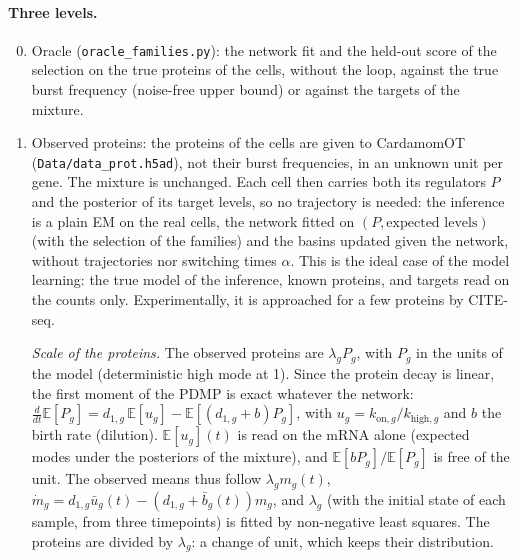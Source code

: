 \documentclass[a4paper, 11pt]{article}
\theoremstyle{plain}
\theoremstyle{remark}
\begin{document}
\paragraph{Three levels.}
\begin{enumerate}[nosep]
\setcounter{enumi}{-1}
\item Oracle (\texttt{oracle\_families.py}): the network fit and the held-out score of the selection on the true proteins of the cells, without the loop, against the true burst frequency (noise-free upper bound) or against the targets of the mixture.
\item Observed proteins: the proteins of the cells are given to CardamomOT (\texttt{Data/data\_prot.h5ad}), not their burst frequencies, in an unknown unit per gene. The mixture is unchanged. Each cell then carries both its regulators $P$ and the posterior of its target levels, so no trajectory is needed: the inference is a plain EM on the real cells, the network fitted on $(P, \text{expected levels})$ (with the selection of the families) and the basins updated given the network, without trajectories nor switching times $\alpha$. This is the ideal case of the model learning: the true model of the inference, known proteins, and targets read on the counts only. Experimentally, it is approached for a few proteins by CITE-seq.

\emph{Scale of the proteins.} The observed proteins are $\lambda_g P_g$, with $P_g$ in the units of the model (deterministic high mode at 1). Since the protein decay is linear, the first moment of the PDMP is exact whatever the network: $\frac{d}{dt}\mathbb{E}[P_g] = d_{1,g}\,\mathbb{E}[u_g] - \mathbb{E}[(d_{1,g} + b)P_g]$, with $u_g = k_{\mathrm{on},g}/k_{\mathrm{high},g}$ and $b$ the birth rate (dilution). $\mathbb{E}[u_g](t)$ is read on the mRNA alone (expected modes under the posteriors of the mixture), and $\mathbb{E}[bP_g]/\mathbb{E}[P_g]$ is free of the unit. The observed means thus follow $\lambda_g m_g(t)$, $\dot m_g = d_{1,g}\bar u_g(t) - (d_{1,g} + \bar b_g(t)) m_g$, and $\lambda_g$ (with the initial state of each sample, from three timepoints) is fitted by non-negative least squares. The proteins are divided by $\lambda_g$: a change of unit, which keeps their distribution.


\end{enumerate}
\end{document}
